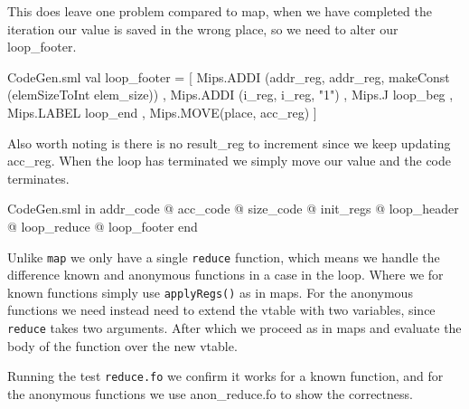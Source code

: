 \documentclass[11pt,a4paper,oneside]{report}
\begin{document}
This does leave one problem compared to map, when we have completed the iteration our value is saved in the wrong place, so we need to alter our loop\_footer.
\begin{code}[firstnumber=672]{CodeGen.sml}
        val loop_footer = [ Mips.ADDI (addr_reg, addr_reg, makeConst (elemSizeToInt elem_size))
                            , Mips.ADDI (i_reg, i_reg, "1")
                            , Mips.J loop_beg
                            , Mips.LABEL loop_end
                            , Mips.MOVE(place, acc_reg)
                            ]
\end{code}
Also worth noting is there is no result\_reg to increment since we keep updating acc\_reg. When the loop has terminated we simply move our value and the code terminates.
\begin{code}[firstnumber=678]{CodeGen.sml}
        in addr_code
          @ acc_code
          @ size_code
          @ init_regs
          @ loop_header
          @ loop_reduce
          @ loop_footer
        end
\end{code}

Unlike \texttt{map} we only have a single \texttt{reduce} function, which means we handle the difference known and anonymous functions in a case in the loop. Where we for known functions simply use \texttt{applyRegs()} as in maps. For the anonymous functions we need instead need to extend the vtable with two variables, since \texttt{reduce} takes two arguments. After which we proceed as in maps and evaluate the body of the function over the new vtable.

Running the test \texttt{reduce.fo} we confirm it works for a known function, and for the anonymous functions we use anon\_reduce.fo to show the correctness.
\end{document}
